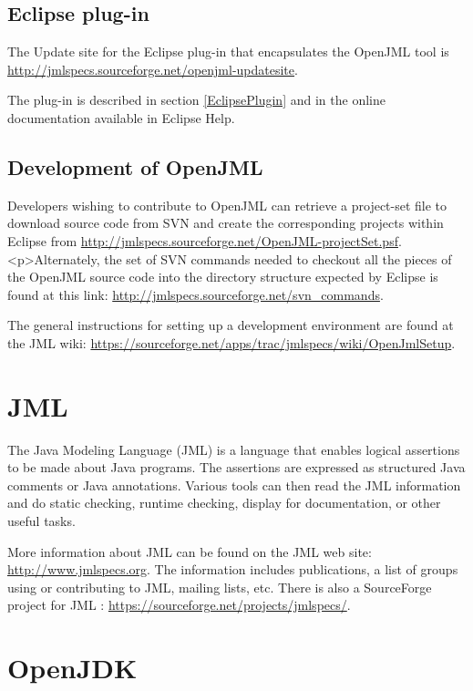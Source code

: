 \subsection{Eclipse plug-in}

The Update site for the Eclipse plug-in that encapsulates the OpenJML tool
is \url{http://jmlspecs.sourceforge.net/openjml-updatesite}.

The plug-in is described in section \ref{EclipsePlugin} and in the online documentation available in Eclipse Help.


\subsection{Development of OpenJML}
\label{Development}

Developers wishing to contribute to OpenJML can retrieve a project-set file to download source code from SVN and create the corresponding projects within Eclipse from 
\url{http://jmlspecs.sourceforge.net/OpenJML-projectSet.psf}.
<p>Alternately, the set of SVN commands needed to checkout all the pieces of the
OpenJML source code into the directory structure expected by Eclipse is found at this link: 
\url{http://jmlspecs.sourceforge.net/svn_commands}.

The general instructions for setting up a development environment are found at the JML wiki: \url{https://sourceforge.net/apps/trac/jmlspecs/wiki/OpenJmlSetup}.



\section{JML}

The Java Modeling Language (JML) is a language that enables logical assertions
to be made about Java programs. The assertions are expressed as structured 
Java comments or Java annotations. Various tools can then read the JML 
information and do static checking, runtime checking, display for documentation,
or other useful tasks.

More information about JML can be found on the JML web site: 
\url{http://www.jmlspecs.org}.
The information includes publications, a list of groups using or contributing to JML, 
mailing lists, etc.
There is also a SourceForge project for JML : \url{https://sourceforge.net/projects/jmlspecs/}.

\section{OpenJDK}

